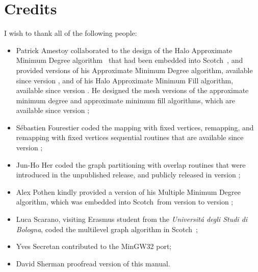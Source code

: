 \documentclass{article}
\newcommand{\scotch}{{\sc Scotch}}               %
\begin{document}
\clearpage


\tableofcontents




\section*{Credits}

I wish to thank all of the following people:
\begin{itemize}
\item
Patrick Amestoy collaborated to the design of the Halo Approximate
Minimum Degree algorithm~\cite{peroam99} that had been embedded into
\scotch\ {}, and provided versions of his Approximate Minimum
Degree algorithm, available since version {}, and of his
Halo Approximate Minimum Fill algorithm, available since version
{}. He designed the mesh versions of the approximate
minimum degree and approximate minimum fill algorithms, which are
available since version {};
\item
S\'ebastien Fourestier coded the mapping with fixed vertices,
remapping, and remapping with fixed vertices sequential routines that
are available since version {};
\item
Jun-Ho Her coded the graph partitioning with overlap routines that
were introduced in the unpublished {} release, and publicly
released in version {};
\item
Alex Pothen kindly provided a version of his Multiple Minimum Degree
algorithm, which was embedded into \scotch\ from version {} to
version {};
\item
Luca Scarano, visiting Erasmus student from the {\it Universit\'a
degli Studi di Bologna}, coded the multilevel graph algorithm
in \scotch\ {};
\item
Yves Secretan contributed to the MinGW32 port;
\item
David Sherman proofread version {} of this manual.
\end{itemize}




\end{document}
